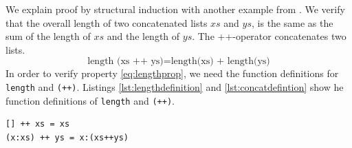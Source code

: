 We explain proof by structural induction with another example from \cite{Thompson}. We verify that the overall length of two concatenated lists $xs$ and $ys$, is the same as the sum of the length of $xs$ and the length of $ys$.  The ++-operator concatenates two lists.
\begin{equation}
  \label{eq:lengthprop}
  \text{length (xs ++ ys)} = \text{length(xs) + length(ys)}
\end{equation}
In order to verify property \ref{eq:lengthprop}, we need the function definitions for \verb|length| and \verb|(++)|.
Listings \ref{lst:lengthdefinition} and \ref{lst:concatdefintion} show he function definitions of \verb|length| and \verb|(++)|.

\begin{lstlisting}[caption={Haskell function definition of the concatenation operator},label={lst:concatdefintion}]
[] ++ xs = xs
(x:xs) ++ ys = x:(xs++ys)
\end{lstlisting}

